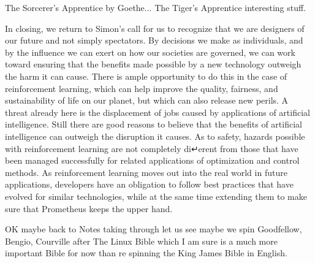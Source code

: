 The Sorcerer's Apprentice by Goethe... The Tiger's Apprentice interesting stuff.

In closing, we return to Simon's call for us to recognize that we are designers of our future and not simply spectators. By decisions we make as individuals, and by the influence we can exert on how our societies are governed, we can work toward ensuring that the benefits made possible by a new technology outweigh the harm it can cause. There is ample opportunity to do this in the case of reinforcement learning, which can help improve the quality, fairness, and sustainability of life on our planet, but which can also release new perils. A threat already here is the displacement of jobs caused by applications of artificial intelligence. Still there are good reasons to believe that the benefits of artificial intelligence can outweigh the disruption it causes. As to safety, hazards possible with reinforcement learning are not completely di↵erent from those that have been managed successfully for related applications of optimization and control methods. As reinforcement learning moves out into the real world in future applications, developers have an obligation to follow best practices that have evolved for similar technologies, while at the same time extending them to make sure that Prometheus keeps the upper hand.

OK maybe back to Notes taking through let us see maybe we spin Goodfellow, Bengio, Courville after The Linux Bible which I am sure is a much more important Bible for now than re spinning the King James Bible in English.
